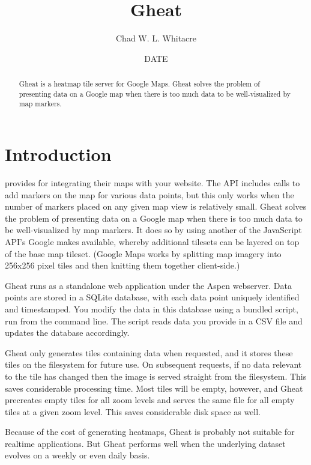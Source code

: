 \documentclass{manual}
\title{Gheat}
\author{Chad W. L. Whitacre}
\date{~~DATE~~} %
\begin{document}
\maketitle

\begin{abstract}

\noindent

Gheat is a heatmap tile server for Google Maps. Gheat solves the problem of
presenting data on a Google map when there is too much data to be
well-visualized by map markers.

\end{abstract}


\chapter{Introduction}
\label{introduction}

 provides  for integrating their maps with your
website. The API includes calls to add markers on the map for various data
points, but this only works when the number of markers placed on any given map
view is relatively small. Gheat solves the problem of presenting data on a
Google map when there is too much data to be well-visualized by map markers. It
does so by using another of the JavaScript API's Google makes available,
whereby additional tilesets can be layered on top of the base map tileset.
(Google Maps works by splitting map imagery into 256x256 pixel tiles and then
knitting them together client-side.)

Gheat runs as a standalone web application under the Aspen webserver. Data 
points are stored in a SQLite database, with each data point uniquely identified
and timestamped. You modify the data in this database using a bundled script, 
run from the command line. The script reads data you provide in a CSV file and 
updates the database accordingly.

Gheat only generates tiles containing data when requested, and it stores these
tiles on the filesystem for future use. On subsequent requests, if no data
relevant to the tile has changed then the image is served straight from the
filesystem. This saves considerable processing time. Most tiles will be empty,
however, and Gheat precreates empty tiles for all zoom levels and serves the
same file for all empty tiles at a given zoom level. This saves considerable
disk space as well.

Because of the cost of generating heatmaps, Gheat is probably not suitable for
realtime applications. But Gheat performs well when the underlying dataset
evolves on a weekly or even daily basis.
\end{document}
